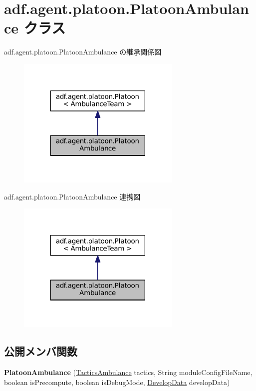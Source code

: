 \hypertarget{classadf_1_1agent_1_1platoon_1_1PlatoonAmbulance}{}\section{adf.\+agent.\+platoon.\+Platoon\+Ambulance クラス}
\label{classadf_1_1agent_1_1platoon_1_1PlatoonAmbulance}


adf.\+agent.\+platoon.\+Platoon\+Ambulance の継承関係図
\nopagebreak
\begin{figure}[H]
\begin{center}
\leavevmode
\includegraphics[width=222pt]{classadf_1_1agent_1_1platoon_1_1PlatoonAmbulance__inherit__graph}
\end{center}
\end{figure}


adf.\+agent.\+platoon.\+Platoon\+Ambulance 連携図
\nopagebreak
\begin{figure}[H]
\begin{center}
\leavevmode
\includegraphics[width=222pt]{classadf_1_1agent_1_1platoon_1_1PlatoonAmbulance__coll__graph}
\end{center}
\end{figure}
\subsection*{公開メンバ関数}
\begin{DoxyCompactItemize}
\item 
\hypertarget{classadf_1_1agent_1_1platoon_1_1PlatoonAmbulance_a499d8bc5703bbbb0f5b3c853e07a7b15}{}\label{classadf_1_1agent_1_1platoon_1_1PlatoonAmbulance_a499d8bc5703bbbb0f5b3c853e07a7b15} 
{\bfseries Platoon\+Ambulance} (\hyperlink{classadf_1_1component_1_1tactics_1_1TacticsAmbulance}{Tactics\+Ambulance} tactics, String module\+Config\+File\+Name, boolean is\+Precompute, boolean is\+Debug\+Mode, \hyperlink{classadf_1_1agent_1_1develop_1_1DevelopData}{Develop\+Data} develop\+Data)
\end{DoxyCompactItemize}
